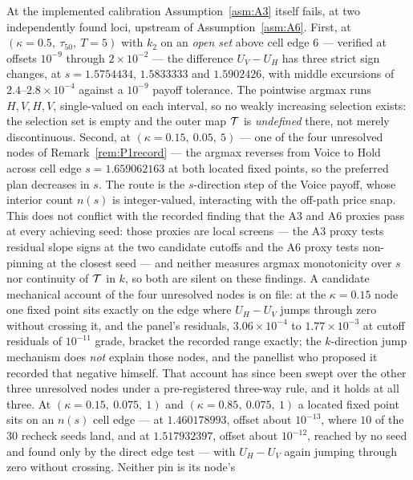 \begin{remark}
\label{rem:A3record}
At the implemented calibration Assumption~\ref{asm:A3} itself fails, at two independently found
loci, upstream of Assumption~\ref{asm:A6}. First, at $(\kappa = 0.5,\ \tau_{50},\ T = 5)$ with $k_2$
on an \emph{open set} above cell edge $6$ --- verified at offsets $10^{-9}$ through
$2\times10^{-2}$ --- the difference $U_V - U_H$ has three strict sign changes, at
$s = 1.5754434$, $1.5833333$ and $1.5902426$, with middle excursions of
$2.4$--$2.8\times10^{-4}$ against a $10^{-9}$ payoff tolerance. The pointwise argmax runs
$H,V,H,V$, single-valued on each interval, so no weakly increasing selection exists: the selection
set is empty and the outer map $\mathcal{T}$ is \emph{undefined} there, not merely discontinuous. Second,
at $(\kappa = 0.15,\ 0.05,\ 5)$ --- one of the four unresolved nodes of
Remark~\ref{rem:P1record} --- the argmax reverses from Voice to Hold across cell edge
$s = 1.659062163$ at both located fixed points, so the preferred plan decreases in $s$. The route is
the $s$-direction step of the Voice payoff, whose interior count $n(s)$ is integer-valued,
interacting with the off-path price snap. This does not conflict with the recorded finding that the
A3 and A6 proxies pass at every achieving seed: those proxies are local screens --- the A3 proxy
tests residual slope signs at the two candidate cutoffs and the A6 proxy tests non-pinning at the
closest seed --- and neither measures argmax monotonicity over $s$ nor continuity of $\mathcal{T}$ in $k$,
so both are silent on these findings. A candidate mechanical account of the four unresolved nodes is
on file: at the $\kappa = 0.15$ node one fixed
point sits exactly on the edge where $U_H - U_V$ jumps through zero without crossing it, and the
panel's residuals, $3.06\times10^{-4}$ to $1.77\times10^{-3}$ at cutoff residuals of
$10^{-11}$ grade, bracket the recorded range exactly; the $k$-direction jump mechanism does
\emph{not} explain those nodes, and the panellist who proposed it recorded that negative himself.
That account has since been swept over the other three unresolved nodes under a pre-registered
three-way rule, and it holds at all three. At $(\kappa = 0.15,\ 0.075,\ 1)$ and
$(\kappa = 0.85,\ 0.075,\ 1)$ a located fixed point sits on an $n(s)$ cell edge --- at
$1.460178993$, offset about $10^{-13}$, where $10$ of the $30$ recheck seeds land, and at
$1.517932397$, offset about $10^{-12}$, reached by no seed and found only by the direct edge test
--- with $U_H - U_V$ again jumping through zero without crossing. Neither pin is its node's

\end{remark}
